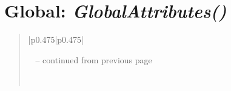 \documentclass[letterpaper,10pt,english]{sphinxmanual}
\begin{document}
\section{\textbf{Global}: \emph{GlobalAttributes()}}
\label{attributes:global-globalattributes}
\begin{DUlineblock}{0em}
\item[] 
\end{DUlineblock}
\begin{quote}

\begin{longtable}{|p{0.475\linewidth}|p{0.475\linewidth}|}
\hline
\endfirsthead

%
{{\textsf{\tablename\ \thetable{} -- continued from previous page}}} \\
\hline
\endhead

\hline {} \\ \hline
\endfoot

\endlastfoot



\end{longtable}
\end{quote}
\end{document}

